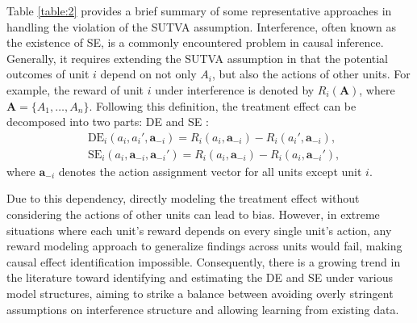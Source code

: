 Table \ref{table:2}  provides a brief summary of some representative approaches in handling the violation of the \acrshort{SUTVA} assumption. 
Interference, often known as the existence of \acrfull{SE}, is a commonly encountered problem in causal inference. 
Generally, it requires extending the \acrshort{SUTVA} assumption in that the potential outcomes of unit $i$ depend on not only $A_i$, but also the actions of other units. 
For example, the reward of unit $i$ under interference is denoted by $R_i(\boldsymbol{A})$, where $\boldsymbol{A} = \{A_1,\dots, A_n\}$. 
Following this definition, the treatment effect can be decomposed into two parts: \acrshort{DE} and \acrshort{SE} : 
\begin{equation*}
    \begin{aligned}
    &\text{DE}_i(a_i,a_i',\boldsymbol{a}_{-i})=R_i(a_i,\boldsymbol{a}_{-i})-R_i(a_i',\boldsymbol{a}_{-i}),\\
    &\text{SE}_i(a_i,\boldsymbol{a}_{-i},\boldsymbol{a}_{-i}')=R_i(a_i,\boldsymbol{a}_{-i})-R_i(a_i,\boldsymbol{a}_{-i}'),
    \end{aligned}
\end{equation*}
where $\boldsymbol{a}_{-i}$ denotes the action assignment vector for all units except unit $i$.

Due to this dependency, directly modeling the treatment effect without considering the actions of other units can lead to bias. 
However, in extreme situations where each unit's reward depends on every single unit's action, any reward modeling approach to generalize findings across units would fail, making causal effect identification impossible. 
Consequently, there is a growing trend in the literature toward identifying and estimating the \acrfull{DE} and \acrfull{SE} under various model structures, aiming to strike a balance between avoiding overly stringent assumptions on
interference structure and allowing learning from existing data. 

